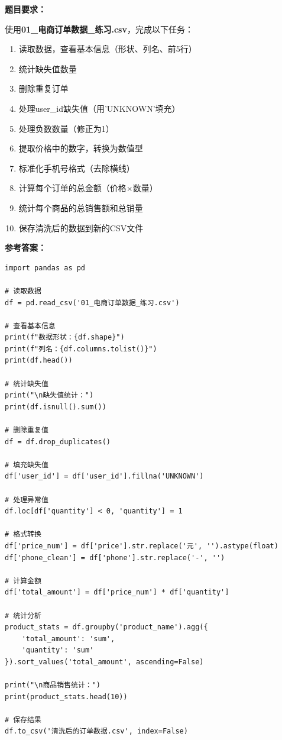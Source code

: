 \documentclass[12pt,a4paper]{article}
\begin{document}
\begin{practicebox}[竞赛模拟题1]
\textbf{题目要求：}

使用\textbf{01\_电商订单数据\_练习.csv}，完成以下任务：

\begin{enumerate}
    \item 读取数据，查看基本信息（形状、列名、前5行）
    \item 统计缺失值数量
    \item 删除重复订单
    \item 处理user\_id缺失值（用'UNKNOWN'填充）
    \item 处理负数数量（修正为1）
    \item 提取价格中的数字，转换为数值型
    \item 标准化手机号格式（去除横线）
    \item 计算每个订单的总金额（价格×数量）
    \item 统计每个商品的总销售额和总销量
    \item 保存清洗后的数据到新的CSV文件
\end{enumerate}

\textbf{参考答案：}
\begin{lstlisting}
import pandas as pd

# 读取数据
df = pd.read_csv('01_电商订单数据_练习.csv')

# 查看基本信息
print(f"数据形状：{df.shape}")
print(f"列名：{df.columns.tolist()}")
print(df.head())

# 统计缺失值
print("\n缺失值统计：")
print(df.isnull().sum())

# 删除重复值
df = df.drop_duplicates()

# 填充缺失值
df['user_id'] = df['user_id'].fillna('UNKNOWN')

# 处理异常值
df.loc[df['quantity'] < 0, 'quantity'] = 1

# 格式转换
df['price_num'] = df['price'].str.replace('元', '').astype(float)
df['phone_clean'] = df['phone'].str.replace('-', '')

# 计算金额
df['total_amount'] = df['price_num'] * df['quantity']

# 统计分析
product_stats = df.groupby('product_name').agg({
    'total_amount': 'sum',
    'quantity': 'sum'
}).sort_values('total_amount', ascending=False)

print("\n商品销售统计：")
print(product_stats.head(10))

# 保存结果
df.to_csv('清洗后的订单数据.csv', index=False)
\end{lstlisting}
\end{practicebox}
\end{document}
